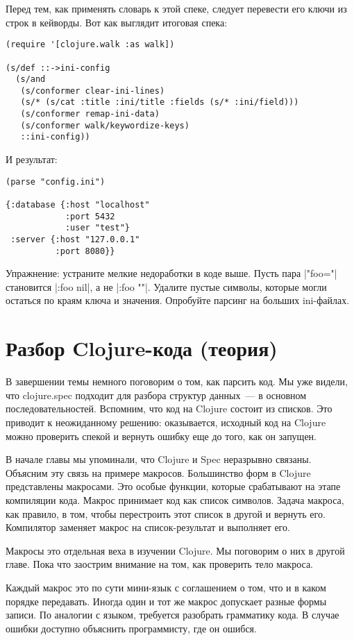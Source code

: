 Перед тем, как применять словарь к этой спеке, следует перевести его ключи из
строк в кейворды. Вот как выглядит итоговая спека:

\begin{verbatim}
(require '[clojure.walk :as walk])

(s/def ::->ini-config
  (s/and
   (s/conformer clear-ini-lines)
   (s/* (s/cat :title :ini/title :fields (s/* :ini/field)))
   (s/conformer remap-ini-data)
   (s/conformer walk/keywordize-keys)
   ::ini-config))
\end{verbatim}

И результат:

\begin{verbatim}
(parse "config.ini")

{:database {:host "localhost"
            :port 5432
            :user "test"}
 :server {:host "127.0.0.1"
          :port 8080}}
\end{verbatim}

Упражнение: устраните мелкие недоработки в коде выше. Пусть пара \spverb|"foo="|
становится \spverb|{:foo nil}|, а не \spverb|{:foo ""}|.  Удалите пустые символы, которые
могли остаться по краям ключа и значения. Опробуйте парсинг на больших
ini-файлах.

\section{Разбор Clojure-кода (теория)}

В завершении темы немного поговорим о том, как парсить код. Мы уже видели, что
clojure.spec подходит для разбора структур данных~--- в основном
последовательностей. Вспомним, что код на Clojure состоит из списков. Это
приводит к неожиданному решению: оказывается, исходный код на Clojure можно
проверить спекой и вернуть ошибку еще до того, как он запущен.

В начале главы мы упоминали, что Clojure и Spec неразрывно связаны. Объясним эту
связь на примере макросов. Большинство форм в Clojure представлены
макросами. Это особые функции, которые срабатывают на этапе компиляции
кода. Макрос принимает код как список символов. Задача макроса, как правило, в
том, чтобы перестроить этот список в другой и вернуть его. Компилятор заменяет
макрос на список-результат и выполняет его.

Макросы это отдельная веха в изучении Clojure. Мы поговорим о них в другой
главе. Пока что заострим внимание на том, как проверить тело макроса.

Каждый макрос это по сути мини-язык с соглашением о том, что и в каком порядке
передавать. Иногда один и тот же макрос допускает разные формы записи. По
аналогии с языком, требуется разобрать грамматику кода. В случае ошибки доступно
объяснить программисту, где он ошибся.

